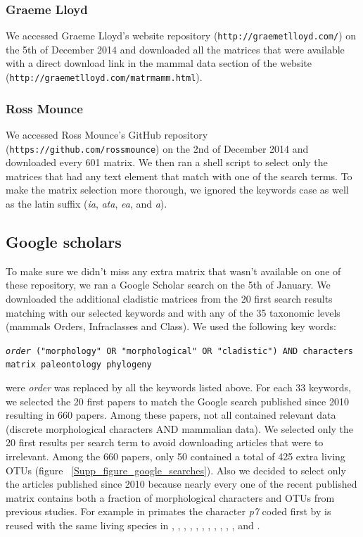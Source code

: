 \subsubsection{Graeme Lloyd}
We accessed Graeme Lloyd's website repository (\texttt{http://graemetlloyd.com/}) on the 5th of December 2014 and downloaded all the matrices that were available with a direct download link in the mammal data section of the website (\texttt{http://graemetlloyd.com/matrmamm.html}).

\subsubsection{Ross Mounce}
We accessed Ross Mounce's GitHub repository (\texttt{https://github.com/rossmounce}) on the 2nd of December 2014 and downloaded every 601 matrix. We then ran a shell script to select only the matrices that had any text element that match with one of the search terms. To make the matrix selection more thorough, we ignored the keywords case as well as the latin suffix (\textit{ia}, \textit{ata}, \textit{ea}, and \textit{a}).

\subsection{Google scholars}
To make sure we didn't miss any extra matrix that wasn't available on one of these repository, we ran a Google Scholar search on the 5th of January. 
We downloaded the additional cladistic matrices from the 20 first search results matching with our selected keywords and with any of the 35 taxonomic levels (mammals Orders, Infraclasses and Class).
We used the following key words:

\texttt{\textit{order} ("morphology" OR "morphological" OR "cladistic") AND characters matrix paleontology phylogeny}

were \textit{order} was replaced by all the keywords listed above. For each 33 keywords, we selected the 20 first papers to match the Google search published since 2010 resulting in 660 papers. Among these papers, not all contained relevant data (discrete morphological characters AND mammalian data). We selected only the 20 first results per search term to avoid downloading articles that were to irrelevant. Among the 660 papers, only 50 contained a total of 425 extra living OTUs (figure ~\ref{Supp_figure_google_searches}).
Also we decided to select only the articles published since 2010 because nearly every one of the recent published matrix contains both a fraction of morphological characters and OTUs from previous studies. For example in primates the character \textit{p7} coded first by \cite{ross1998phylogenetic} is reused with the same living species in \cite{seiffert2003fossil}, \cite{marivaux2005anthropoid}, \cite{seiffert2005basal}, \cite{bloch2007new}, \cite{bloch2007new}, \cite{kay2008anatomy}, \cite{silcox2008biogeographic}, \cite{seiffert2009convergent}, \cite{tabuce2009anthropoid}, \cite{boyer2010astragalar}, \cite{seiffert2010fossil}, \cite{marivaux2013djebelemur} and \cite{ni2013oldest}.

